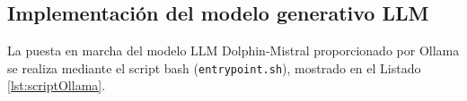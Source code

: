 \newpage
\subsection{Implementación del modelo generativo LLM}
La puesta en marcha del modelo LLM Dolphin-Mistral proporcionado por Ollama se realiza mediante el script bash (\verb|entrypoint.sh|), mostrado en el Listado \ref{lst:scriptOllama}.







